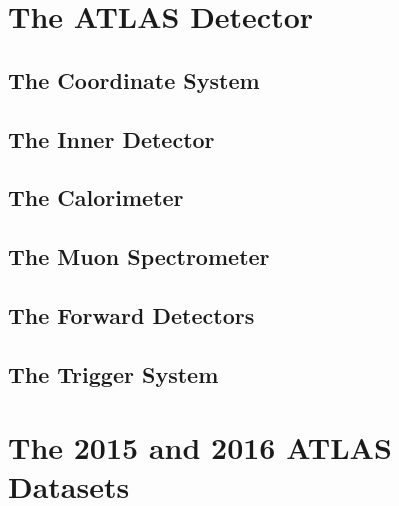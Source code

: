 \documentclass[10pt,twoside,cucitura,classica,english,openany]{toptesi}
\begin{document}


\section{The ATLAS Detector}
\label{sec:atlas-detector}



\subsection{The Coordinate System}
\label{sec:coordinate-system}



\subsection{The Inner Detector}
\label{sec:inner-detector}



\subsection{The Calorimeter}
\label{sec:calorimeters}



\subsection{The Muon Spectrometer}
\label{sec:muon-spectrometer}



\subsection{The Forward Detectors}
\label{sec:forward-detectors}



\subsection{The Trigger System}
\label{sec:trigger-system}



\section{The 2015 and 2016 ATLAS Datasets}
\label{sec:atlas-datasets}
\end{document}
